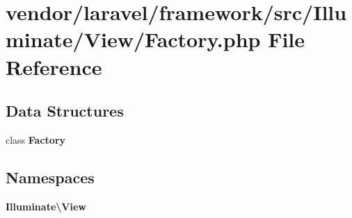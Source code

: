 \section{vendor/laravel/framework/src/\+Illuminate/\+View/\+Factory.php File Reference}
\label{laravel_2framework_2src_2_illuminate_2_view_2_factory_8php}
\subsection*{Data Structures}
\begin{DoxyCompactItemize}
\item 
class {\bf Factory}
\end{DoxyCompactItemize}
\subsection*{Namespaces}
\begin{DoxyCompactItemize}
\item 
 {\bf Illuminate\textbackslash{}\+View}
\end{DoxyCompactItemize}
